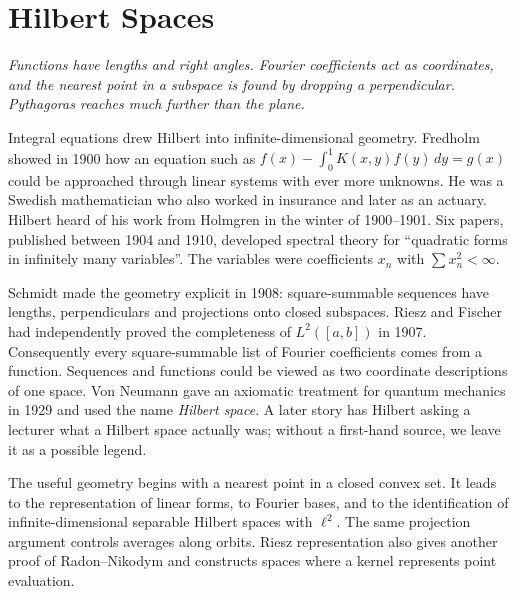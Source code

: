 \chapter{Hilbert Spaces}\label{ch:hilbert}

\begin{center}\itshape
Functions have lengths and right angles. Fourier coefficients act as coordinates, and the nearest point in a subspace is found by dropping a perpendicular. Pythagoras reaches much further than the plane.
\end{center}

Integral equations drew Hilbert into infinite-dimensional geometry. Fredholm showed in 1900 how an equation such as $f(x)-\int_0^1K(x,y)f(y)\,dy=g(x)$ could be approached through linear systems with ever more unknowns. He was a Swedish mathematician who also worked in insurance and later as an actuary. Hilbert heard of his work from Holmgren in the winter of 1900--1901. Six papers, published between 1904 and 1910, developed spectral theory for ``quadratic forms in infinitely many variables''. The variables were coefficients $x_n$ with $\sum x_n^2<\infty$.



Schmidt made the geometry explicit in 1908: square-summable sequences have lengths, perpendiculars and projections onto closed subspaces. Riesz and Fischer had independently proved the completeness of $L^2([a,b])$ in 1907. Consequently every square-summable list of Fourier coefficients comes from a function. Sequences and functions could be viewed as two coordinate descriptions of one space. Von Neumann gave an axiomatic treatment for quantum mechanics in 1929 and used the name \emph{Hilbert space}. A later story has Hilbert asking a lecturer what a Hilbert space actually was; without a first-hand source, we leave it as a possible legend.

The useful geometry begins with a nearest point in a closed convex set. It leads to the representation of linear forms, to Fourier bases, and to the identification of infinite-dimensional separable Hilbert spaces with $\ell^2$. The same projection argument controls averages along orbits. Riesz representation also gives another proof of Radon--Nikodym and constructs spaces where a kernel represents point evaluation.

